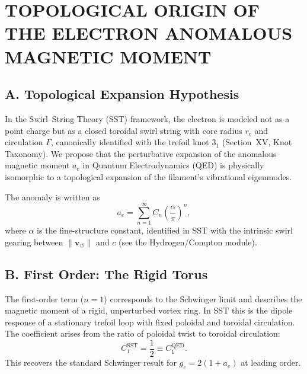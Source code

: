 
\section{TOPOLOGICAL ORIGIN OF THE ELECTRON ANOMALOUS MAGNETIC MOMENT}
\subsection*{A. Topological Expansion Hypothesis}

    In the Swirl--String Theory (SST) framework, the electron is modeled not as a point charge but as a closed toroidal
    swirl string with core radius $r_c$ and circulation $\Gamma$, canonically identified with the trefoil knot $3_1$
    (Section~XV, Knot Taxonomy).
    We propose that the perturbative expansion of the anomalous magnetic moment $a_e$ in Quantum Electrodynamics (QED)
    is physically isomorphic to a topological expansion of the filament's vibrational eigenmodes.

    The anomaly is written as
    \begin{equation}
        a_e = \sum_{n=1}^{\infty} C_n \left( \frac{\alpha}{\pi} \right)^n ,
    \end{equation}
    where $\alpha$ is the fine-structure constant, identified in SST with the intrinsic swirl gearing between
    $\lVert\mathbf{v}_{\!\boldsymbol{\circlearrowleft}}\rVert$ and $c$ (see the Hydrogen/Compton module).

\subsection*{B. First Order: The Rigid Torus}

    The first-order term ($n = 1$) corresponds to the Schwinger limit and describes the magnetic moment of a rigid,
    unperturbed vortex ring. In SST this is the dipole response of a stationary trefoil loop with fixed poloidal and
    toroidal circulation. The coefficient arises from the ratio of poloidal twist to toroidal circulation:
    \begin{equation}
        C_1^{\text{SST}} = \frac{1}{2} \equiv C_1^{\text{QED}} .
    \end{equation}
    This recovers the standard Schwinger result for $g_e = 2(1 + a_e)$ at leading order.

